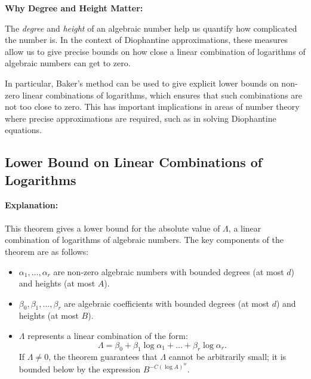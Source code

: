 \documentclass{article}
\begin{document}
\textbf{Why Degree and Height Matter:}

The \emph{degree} and \emph{height} of an algebraic number help us quantify how complicated the number is. In the context of Diophantine approximations, these measures allow us to give precise bounds on how close a linear combination of logarithms of algebraic numbers can get to zero.

In particular, Baker's method can be used to give explicit lower bounds on non-zero linear combinations of logarithms, which ensures that such combinations are not too close to zero. This has important implications in areas of number theory where precise approximations are required, such as in solving Diophantine equations.

\subsection{Lower Bound on Linear Combinations of Logarithms}

\textbf{Explanation:}\\\\


This theorem gives a lower bound for the absolute value of $\Lambda$, a linear combination of logarithms of algebraic numbers. The key components of the theorem are as follows:

\begin{itemize}
    \item $\alpha_1, \dots, \alpha_r$ are non-zero algebraic numbers with bounded degrees (at most $d$) and heights (at most $A$).
    \item $\beta_0, \beta_1, \dots, \beta_r$ are algebraic coefficients with bounded degrees (at most $d$) and heights (at most $B$).
    \item $\Lambda$ represents a linear combination of the form:
    \[
    \Lambda = \beta_0 + \beta_1 \log \alpha_1 + \dots + \beta_r \log \alpha_r.
    \]
    If $\Lambda \neq 0$, the theorem guarantees that $\Lambda$ cannot be arbitrarily small; it is bounded below by the expression $B^{-C(\log A)^w}$.
\end{itemize}
\end{document}
